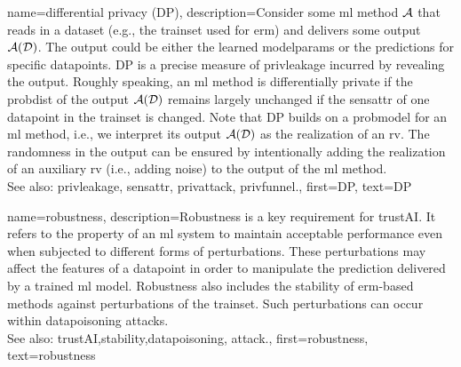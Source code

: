 {name={differential privacy (DP)},
  description={Consider some \gls{ml} method $\mathcal{A}$ 
  	that reads in a \gls{dataset} (e.g., the \gls{trainset} 
  	used for \gls{erm}) and delivers some output $\mathcal{A}(\mathcal{D})$. The output 
  	could be either the learned \gls{modelparams} or the \glspl{prediction} for specific \glspl{datapoint}. 
  	DP is a precise measure of \gls{privleakage} incurred by revealing the 
  	output. Roughly speaking, an \gls{ml} method is differentially private if the \gls{probdist} 
  	of the output $\mathcal{A}(\mathcal{D})$ remains largely unchanged if the \gls{sensattr} 
  	of one \gls{datapoint} in the \gls{trainset} is changed. Note that DP 
  	builds on a \gls{probmodel} for an \gls{ml} method, i.e., we interpret its output $\mathcal{A}(\mathcal{D})$ 
  	as the \gls{realization} of an \gls{rv}. The randomness in the output can be ensured 
  	by intentionally adding the \gls{realization} of an auxiliary \gls{rv} (i.e., adding noise) to 
  	the output of the \gls{ml} method.
				\\ 
	See also: \gls{privleakage}, \gls{sensattr}, \gls{privattack}, \gls{privfunnel}.}, 
  first={DP}, 
  text={DP} 
}

{name={robustness},
	description={Robustness is a key requirement for \gls{trustAI}. It
		refers to the property of an \gls{ml} system to maintain acceptable performance even when 
		subjected to different forms of perturbations. These perturbations may affect the \glspl{feature} 
		of a \gls{datapoint} in order to manipulate the \gls{prediction} delivered by a trained \gls{ml} \gls{model}. 
		Robustness also includes the \gls{stability} of \gls{erm}-based methods against perturbations 
		of the \gls{trainset}. Such perturbations can occur within \gls{datapoisoning} \glspl{attack}. 
		\\ 
		See also: \gls{trustAI},\gls{stability},\gls{datapoisoning}, \gls{attack}.}, 
	first={robustness}, 
	text={robustness} 
}


